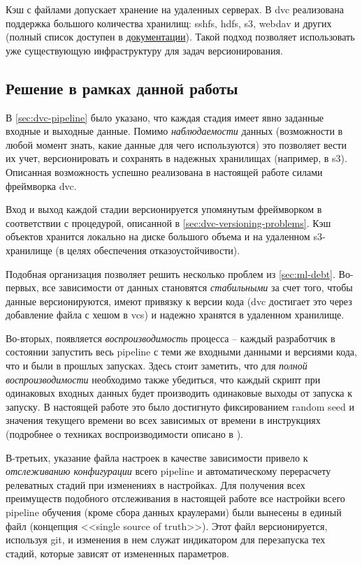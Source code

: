 Кэш с файлами допускает хранение на удаленных серверах.
В \gls{dvc} реализована поддержка большого количества хранилищ: \acrshort{sshfs}, \gls{hdfs}, \gls{s3}, \gls{webdav} и других (полный список доступен в \href{https://dvc.org/doc/command-reference/remote/add#supported-storage-types}{документации}).
Такой подход позволяет использовать уже существующую инфраструктуру для задач версионирования.

\subsection{Решение в рамках данной работы}
В \ref{sec:dvc-pipeline} было указано, что каждая стадия имеет явно заданные входные и выходные данные.
Помимо \textit{наблюдаемости} данных (возможности в любой момент знать, какие данные для чего используются) это позволяет вести их учет, версионировать и сохранять в надежных хранилищах (например, в \gls{s3}).
Описанная возможность успешно реализована в настоящей работе силами фреймворка \gls{dvc}.

Вход и выход каждой стадии версионируется упомянутым фреймворком в соответствии с процедурой, описанной в \ref{sec:dvc-versioning-problems}.
Кэш объектов хранится локально на диске большого объема и на удаленном \gls{s3}-хранилище (в целях обеспечения отказоустойчивости).

Подобная организация позволяет решить несколько проблем из \ref{sec:ml-debt}.
Во-первых, все зависимости от данных становятся \textit{стабильными} за счет того, чтобы данные версионируются, имеют привязку к версии кода (\gls{dvc} достигает это через добавление файла с хешом в \gls{vcs}) и надежно хранятся в удаленном хранилище.

Во-вторых, появляется \textit{воспроизводимость} процесса -- каждый разработчик в состоянии запустить весь \gls{pipeline} с теми же входными данными и версиями кода, что и были в прошлых запусках.
Здесь стоит заметить, что для \textit{полной воспроизводимости} необходимо также убедиться, что каждый скрипт при одинаковых входных данных будет производить одинаковые выходы от запуска к запуску.
В настоящей работе это было достигнуто фиксированием random seed и значения текущего времени во всех зависимых от времени в инструкциях (подробнее о техниках воспроизводимости описано в \cite{cite:ml-reproducibility}).

В-третьих, указание файла настроек в качестве зависимости привело к \textit{отслеживанию конфигурации} всего \gls{pipeline} и автоматическому перерасчету релеватных стадий при изменениях в настройках.
Для получения всех преимуществ подобного отслеживания в настоящей работе все настройки всего \gls{pipeline} обучения (кроме сбора данных краулерами) были вынесены в единый файл (концепция <<single source of truth>>).
Этот файл версионируется, используя \gls{git}, и изменения в нем служат индикатором для перезапуска тех стадий, которые зависят от измененных параметров.


